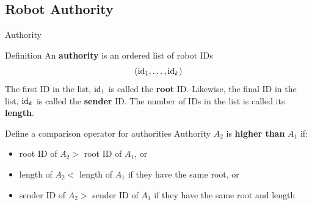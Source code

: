 \documentclass[10pt]{beamer}
\newcommand{\id}{{\rm id}}
\begin{document}
\subsection{Robot Authority}
\begin{frame}{Authority}
  \begin{bclogo}[logo=\bccrayon,couleur=orange!10, arrondi=0.2,
    ombre=true]{Definition}
    An \textbf{authority} is an ordered list of robot IDs
    $$(\id_1, \ldots, \id_k) $$
    The first ID in the list, $\id_1$ is called the \textbf{root} ID.
    Likewise, the final ID in the list, $\id_k$ is called the
    \textbf{sender} ID.  The number of IDs in the list is called
    its \textbf{length}.
  \end{bclogo}
  \begin{block}{Define a comparison operator for authorities}
    Authority $A_2$ is \textbf{higher than} $A_1$ if:
    \begin{itemize}
    \item \small{root ID of $A_2 >$ root ID of $A_1$, or}
    \item \small{length of $A_2 <$  length of $A_1$ if they have the same root, or}
    \item \small{sender ID of $A_2 >$ sender ID of $A_1$ if they have the same
    root and length }
  \end{itemize}

       
  \end{block}
\end{frame}
\end{document}

